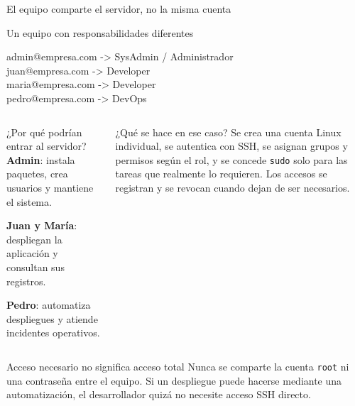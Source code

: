 \documentclass[aspectratio=169,10pt,c]{beamer}
\begin{document}
\begin{frame}{El equipo comparte el servidor, no la misma cuenta}
\begin{exampleblock}{Un equipo con responsabilidades diferentes}
\begin{terminal}\scriptsize
admin@empresa.com  -> SysAdmin / Administrador\\
juan@empresa.com   -> Developer\\
maria@empresa.com  -> Developer\\
pedro@empresa.com  -> DevOps
\end{terminal}
\end{exampleblock}
\begin{columns}[T,onlytextwidth]
\begin{block}{¿Por qué podrían entrar al servidor?}
\footnotesize
\textbf{Admin}: instala paquetes, crea usuarios y mantiene el sistema.\par\smallskip
\textbf{Juan y María}: despliegan la aplicación y consultan sus registros.\par\smallskip
\textbf{Pedro}: automatiza despliegues y atiende incidentes operativos.
\end{block}
\begin{block}{¿Qué se hace en ese caso?}
\footnotesize Se crea una cuenta Linux individual, se autentica con SSH, se asignan grupos y permisos según el rol, y se concede \texttt{sudo} solo para las tareas que realmente lo requieren. Los accesos se registran y se revocan cuando dejan de ser necesarios.
\end{block}
\end{columns}
\begin{alertblock}{Acceso necesario no significa acceso total}
\small Nunca se comparte la cuenta \texttt{root} ni una contraseña entre el equipo. Si un despliegue puede hacerse mediante una automatización, el desarrollador quizá no necesite acceso SSH directo.
\end{alertblock}
\end{frame}
\end{document}
